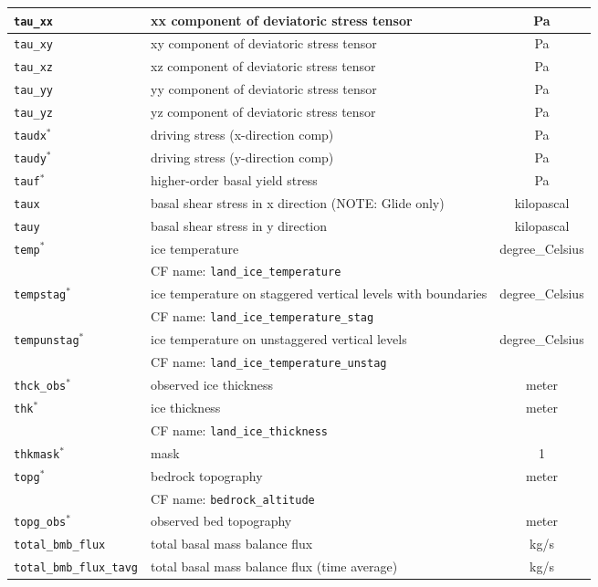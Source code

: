 \begin{center}
\begin{supertabular}{|l|p{8cm}|c|}
\hline
\texttt{tau\_xx} & xx component of deviatoric stress tensor & Pa\\
\hline
\texttt{tau\_xy} & xy component of deviatoric stress tensor & Pa\\
\hline
\texttt{tau\_xz} & xz component of deviatoric stress tensor & Pa\\
\hline
\texttt{tau\_yy} & yy component of deviatoric stress tensor & Pa\\
\hline
\texttt{tau\_yz} & yz component of deviatoric stress tensor & Pa\\
\hline
\texttt{taudx}$^\ast$ & driving stress (x-direction comp) & Pa\\
\hline
\texttt{taudy}$^\ast$ & driving stress (y-direction comp) & Pa\\
\hline
\texttt{tauf}$^\ast$ & higher-order basal yield stress & Pa\\
\hline
\texttt{taux} & basal shear stress in x direction (NOTE: Glide only) & kilopascal\\
\hline
\texttt{tauy} & basal shear stress in y direction & kilopascal\\
\hline
\texttt{temp}$^\ast$ & ice temperature & degree\_Celsius\\
&CF name: \texttt{land\_ice\_temperature}&\\
\hline
\texttt{tempstag}$^\ast$ & ice temperature on staggered vertical levels with boundaries & degree\_Celsius\\
&CF name: \texttt{land\_ice\_temperature\_stag}&\\
\hline
\texttt{tempunstag}$^\ast$ & ice temperature on unstaggered vertical levels & degree\_Celsius\\
&CF name: \texttt{land\_ice\_temperature\_unstag}&\\
\hline
\texttt{thck\_obs}$^\ast$ & observed ice thickness & meter\\
\hline
\texttt{thk}$^\ast$ & ice thickness & meter\\
&CF name: \texttt{land\_ice\_thickness}&\\
\hline
\texttt{thkmask}$^\ast$ & mask & 1\\
\hline
\texttt{topg}$^\ast$ & bedrock topography & meter\\
&CF name: \texttt{bedrock\_altitude}&\\
\hline
\texttt{topg\_obs}$^\ast$ & observed bed topography & meter\\
\hline
\texttt{total\_bmb\_flux} & total basal mass balance flux & kg/s\\
\hline
\texttt{total\_bmb\_flux\_tavg} & total basal mass balance flux (time average) & kg/s\\

\end{supertabular}
\end{center}
